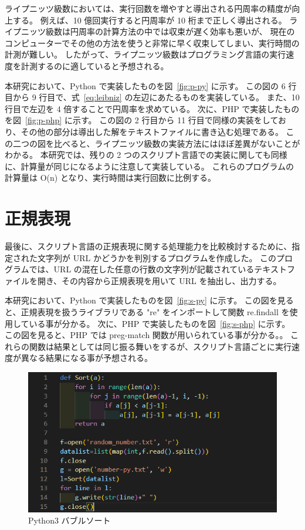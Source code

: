 ライプニッツ級数においては、実行回数を増やすと導出される円周率の精度が向上する。
例えば、10 億回実行すると円周率が 10 桁まで正しく導出される。
ライプニッツ級数は円周率の計算方法の中では収束が遅く効率も悪いが、
現在のコンピューターでその他の方法を使うと非常に早く収束してしまい、実行時間の計測が難しい。
したがって、ライプニッツ級数はプログラミング言語の実行速度を計測するのに適していると予想される。

本研究において、Python で実装したものを図~\ref{fig:p-py} に示す。
この図の 6 行目から 9 行目で、式~\ref{eq:leibniz} の左辺にあたるものを実装している。
また、10 行目で左辺を 4 倍することで円周率を求めている。
次に、PHP で実装したものを図~\ref{fig:p-php} に示す。
この図の 2 行目から 11 行目で同様の実装をしており、その他の部分は導出した解をテキストファイルに書き込む処理である。
この二つの図を比べると、ライプニッツ級数の実装方法にはほぼ差異がないことがわかる。
本研究では、残りの 2 つのスクリプト言語での実装に関しても同様に、計算量が同じになるように注意して実装している。
これらのプログラムの計算量は O(n) となり、実行時間は実行回数に比例する。

\section{正規表現}
\label{cha:program:regex}

最後に、スクリプト言語の正規表現に関する処理能力を比較検討するために、指定された文字列が URL かどうかを判別するプログラムを作成した。
このプログラムでは、URL の混在した任意の行数の文字列が記載されているテキストファイルを開き、その内容から正規表現を用いて URL を抽出し、出力する。

本研究において、Python で実装したものを図~\ref{fig:s-py} に示す。
この図を見ると、正規表現を扱うライブラリである "re" をインポートして関数 re.findall を使用している事が分かる。
次に、PHP で実装したものを図~\ref{fig:s-php} に示す。
この図を見ると、PHP では preg-match 関数が用いられている事が分かる。。
これらの関数は結果としては同じ振る舞いをするが、スクリプト言語ごとに実行速度が異なる結果になる事が予想される。

\begin{figure}[tb]
    \centering
    \includegraphics[width=13.5cm,keepaspectratio]{figure/b-rb.PNG}
    \caption{Python3 バブルソート}
    \label{fig:b-rb}
\end{figure}

